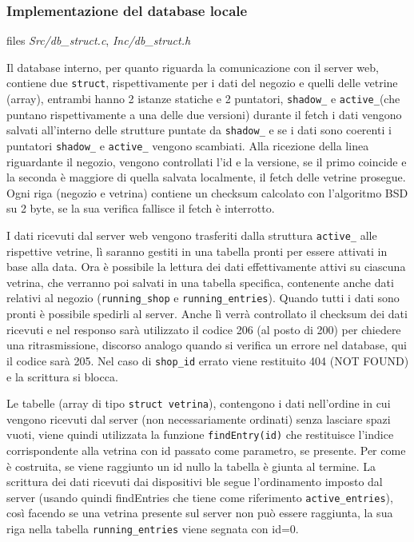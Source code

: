 \subsubsection{Implementazione del database locale}

files \textit{Src/db\_struct.c}, \textit{Inc/db\_struct.h}

Il database interno, per quanto riguarda la comunicazione con il server web, contiene due \texttt{struct}, rispettivamente per i dati del negozio e quelli delle vetrine (array), entrambi hanno 2 istanze statiche e 2 puntatori, \texttt{shadow\_} e \texttt{active\_}(che puntano rispettivamente a una delle due versioni) durante il fetch i dati vengono salvati all'interno delle strutture puntate da \texttt{shadow\_} e se i dati sono coerenti i puntatori \texttt{shadow\_} e \texttt{active\_} vengono scambiati. Alla ricezione della linea riguardante il negozio, vengono controllati l'id e la versione, se il primo coincide e la seconda \`{e} maggiore di quella salvata localmente, il fetch delle vetrine prosegue. Ogni riga (negozio e vetrina) contiene un checksum calcolato con l'algoritmo BSD su 2 byte, se la sua verifica fallisce il fetch \`{e} interrotto.

I dati ricevuti dal server web vengono trasferiti dalla struttura \texttt{active\_} alle rispettive vetrine, l\`{i} saranno gestiti in una tabella pronti per essere attivati in base alla data. Ora \`{e} possibile la lettura dei dati effettivamente attivi su ciascuna vetrina, che verranno poi salvati in una tabella specifica, contenente anche dati relativi al negozio (\texttt{running\_shop} e \texttt{running\_entries}). Quando tutti i dati sono pronti \`{e} possibile spedirli al server. Anche l\`{i} verr\`{a} controllato il checksum dei dati ricevuti e nel responso sar\`{a} utilizzato il codice 206 (al posto di 200) per chiedere una ritrasmissione, discorso analogo quando si verifica un errore nel database, qui il codice sar\`{a} 205. Nel caso di \texttt{shop\_id} errato viene restituito 404 (NOT FOUND) e la scrittura si blocca.

Le tabelle (array di tipo \texttt{struct vetrina}), contengono i dati nell'ordine in cui vengono ricevuti dal server (non necessariamente ordinati) senza lasciare spazi vuoti, viene quindi utilizzata la funzione \texttt{findEntry(id)} che restituisce l'indice corrispondente alla vetrina con id passato come parametro, se presente. Per come \`{e} costruita, se viene raggiunto un id nullo la tabella \`{e} giunta al termine. La scrittura dei dati ricevuti dai dispositivi ble segue l'ordinamento imposto dal server (usando quindi findEntries che tiene come riferimento \texttt{active\_entries}), cos\`{i} facendo se una vetrina presente sul server non pu\`{o} essere raggiunta, la sua riga nella tabella \texttt{running\_entries} viene segnata con id=0.

